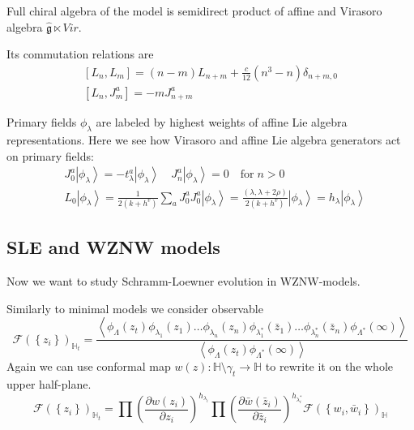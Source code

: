 \documentclass[12pt]{article}
\theoremstyle{definition}
\newcommand{\gfh}{\hat{\mathfrak{g}}}
\theoremstyle{definition} \newtheorem{Def}{Definition}
\begin{document}
Full chiral algebra of the model is semidirect product of affine and Virasoro algebra $\gfh \ltimes Vir$. 

Its commutation relations are
  \begin{equation}
    \label{eq:92}
    \begin{aligned}
      \left[L_n,L_m\right]=(n-m)L_{n+m}+\frac{c}{12}(n^3-n)\delta_{n+m,0}\\
      \left[L_n,J^a_m\right]=-mJ^a_{n+m}
    \end{aligned}
  \end{equation}

Primary fields  $\phi_{\lambda}$ are labeled by highest weights of affine Lie algebra representations. Here we see how Virasoro and affine Lie algebra generators act on primary fields:
  \begin{equation*}
    \begin{aligned}
      & J_0^a\left|\phi_{\lambda}\right>=-t^a_{\lambda}\left|\phi_{\lambda}\right>  \quad    J^a_n\left|\phi_{\lambda}\right>=0 \quad \mbox{for}\; n>0 \\
      & L_0\left|\phi_{\lambda}\right>=\frac{1}{2(k+h^v)}\sum_aJ^a_0J^a_0\left|\phi_{\lambda}\right>=\frac{(\lambda,\lambda+2\rho)}{2(k+h^v)}\left|\phi_{\lambda}\right>=h_{\lambda} \left|\phi_{\lambda}\right>
    \end{aligned}
  \end{equation*}


\subsection{SLE and WZNW models}
Now we want to study Schramm-Loewner evolution in WZNW-models.

Similarly to minimal models we consider observable
\begin{equation*}
  \mathcal{F}(\left\{z_{i}\right\})_{\mathbb{H}_{t}}=
  \frac{\left<\phi_{\Lambda}(z_{t}) \phi_{\lambda_1}(z_{1}) \dots \phi_{\lambda_n}(z_{n}) \phi_{\lambda^{*}_1}(\bar z_{1}) \dots \phi_{\lambda^{*}_n}(\bar z_{n})
      \phi_{\Lambda^{*}}(\infty)\right>}{\left<\phi_{\Lambda}(z_{t})\phi_{\Lambda^{*}}(\infty)\right>}
\end{equation*}
Again we can use conformal map  $w(z):\mathbb{H}\setminus\gamma_{t}\to \mathbb{H}$ to rewrite it on the whole upper half-plane. 
\begin{equation*}
  \mathcal{F}(\left\{z_{i}\right\})_{\mathbb{H}_{t}}=\prod \left(\frac{\partial w(z_{i})}{\partial z_{i}}\right)^{h_{\lambda_i}} 
  \prod \left(\frac{\partial \bar w(\bar z_{i})}{\partial \bar z_{i}}\right)^{h_{\lambda^{*}_i}}
  \mathcal{F}(\left\{w_{i}, \bar w_{i}\right\})_{\mathbb{H}}
\end{equation*}
\end{document}
